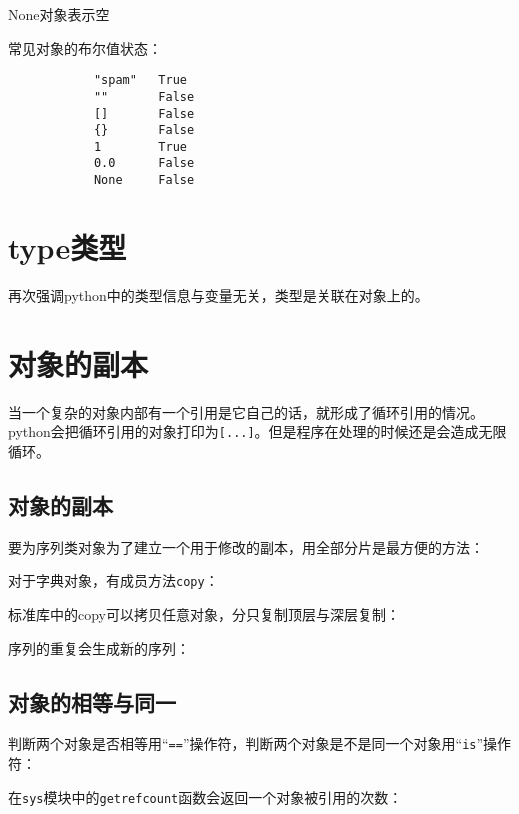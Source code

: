 		None对象表示空
		
		

		常见对象的布尔值状态：

		\begin{verbatim}
			"spam"   True
			""       False
			[]       False
			{}       False
			1        True
			0.0      False
			None     False
		\end{verbatim}

	\section{type类型}

		再次强调python中的类型信息与变量无关，类型是关联在对象上的。

		

	\section{对象的副本}

		当一个复杂的对象内部有一个引用是它自己的话，就形成了循环引用的情况。python会把循环引用的对象打印为\verb|[...]|。但是程序在处理的时候还是会造成无限循环。	

		\subsection{对象的副本}

			要为序列类对象为了建立一个用于修改的副本，用全部分片是最方便的方法：

			

			对于字典对象，有成员方法\verb|copy|：

			

			标准库中的copy可以拷贝任意对象，分只复制顶层与深层复制：

			

			序列的重复会生成新的序列：

			
		\subsection{对象的相等与同一}

			判断两个对象是否相等用“\verb|==|”操作符，判断两个对象是不是同一个对象用“\verb|is|”操作符：

			

			在\verb|sys|模块中的\verb|getrefcount|函数会返回一个对象被引用的次数：

			
